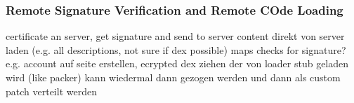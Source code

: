 \subsubsection{Remote Signature Verification and Remote COde Loading}\label{subsubsection:counter-tampering-signature-remote}
certificate an server, get signature and send to server\newline
content direkt von server laden (e.g. all descriptions, not sure if dex possible)\newline
maps checks for signature?\newline
e.g. account auf seite erstellen, ecrypted dex ziehen der von loader stub geladen wird (like packer)
kann wiedermal dann gezogen werden und dann als custom patch verteilt werden\newline
